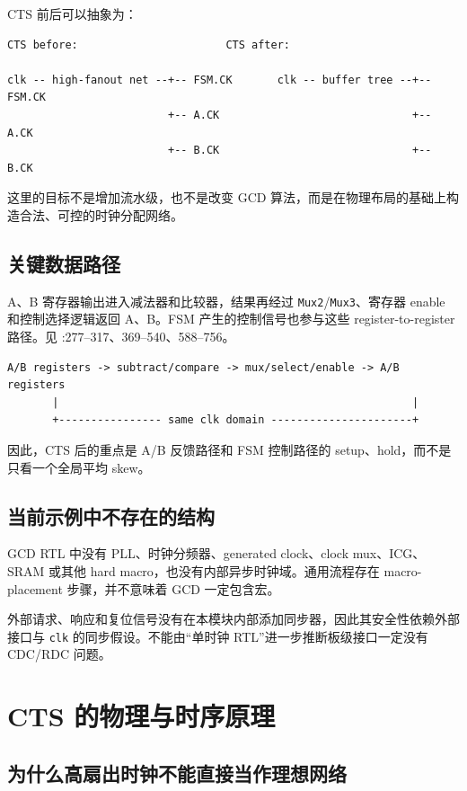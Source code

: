 \documentclass[UTF8,a4paper,11pt,fontset=fandol]{ctexart}
\newcommand{\code}[1]{\nolinkurl{#1}}
\begin{document}
CTS 前后可以抽象为：
\begin{verbatim}
CTS before:                       CTS after:

clk -- high-fanout net --+-- FSM.CK       clk -- buffer tree --+-- FSM.CK
                         +-- A.CK                              +-- A.CK
                         +-- B.CK                              +-- B.CK
\end{verbatim}

这里的目标不是增加流水级，也不是改变 GCD 算法，而是在物理布局的基础上构造合法、可控的时钟分配网络。

\subsection{关键数据路径}

A、B 寄存器输出进入减法器和比较器，结果再经过 \code{Mux2}/\code{Mux3}、寄存器 enable 和控制选择逻辑返回 A、B。FSM 产生的控制信号也参与这些 register-to-register 路径。见 :277--317、369--540、588--756。

\begin{verbatim}
A/B registers -> subtract/compare -> mux/select/enable -> A/B registers
       |                                                       |
       +---------------- same clk domain ----------------------+
\end{verbatim}

因此，CTS 后的重点是 A/B 反馈路径和 FSM 控制路径的 setup、hold，而不是只看一个全局平均 skew。

\subsection{当前示例中不存在的结构}

GCD RTL 中没有 PLL、时钟分频器、generated clock、clock mux、ICG、SRAM 或其他 hard macro，也没有内部异步时钟域。通用流程存在 macro-placement 步骤，并不意味着 GCD 一定包含宏。

外部请求、响应和复位信号没有在本模块内部添加同步器，因此其安全性依赖外部接口与 \code{clk} 的同步假设。不能由“单时钟 RTL”进一步推断板级接口一定没有 CDC/RDC 问题。

\section{CTS 的物理与时序原理}

\subsection{为什么高扇出时钟不能直接当作理想网络}
\end{document}
